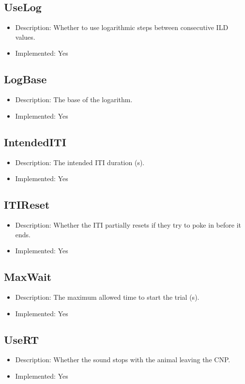 \subsection*{UseLog}
\begin{itemize}
	\item Description: Whether to use logarithmic steps between consecutive ILD values.
	\item Implemented: Yes
\end{itemize}

\subsection*{LogBase}
\begin{itemize}
	\item Description: The base of the logarithm.
	\item Implemented: Yes
\end{itemize}

\subsection*{IntendedITI}
\begin{itemize}
	\item Description: The intended ITI duration (s).
	\item Implemented: Yes
\end{itemize}

\subsection*{ITIReset}
\begin{itemize}
	\item Description: Whether the ITI partially resets if they try to poke in before it ends.
	\item Implemented: Yes
\end{itemize}

\subsection*{MaxWait}
\begin{itemize}
	\item Description: The maximum allowed time to start the trial (s).
	\item Implemented: Yes
\end{itemize}

\subsection*{UseRT}
\begin{itemize}
	\item Description: Whether the sound stops with the animal leaving the CNP.
	\item Implemented: Yes
\end{itemize}

